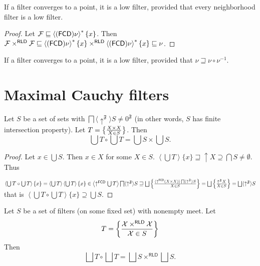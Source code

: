 \begin{prop}
  If a filter converges to a point, it is a low filter, provided that every
  neighborhood filter is a low filter.
\end{prop}

\begin{proof}
  Let $\mathcal{F} \sqsubseteq \left\langle (\mathsf{FCD}) \nu\right\rangle ^{\ast} \{ x \}$. Then $\mathcal{F} \times^{\mathsf{RLD}}
  \mathcal{F} \sqsubseteq \left\langle (\mathsf{FCD}) \nu\right\rangle ^{\ast} \{
  x \} \times^{\mathsf{RLD}} \left\langle (\mathsf{FCD}) \nu\right\rangle ^{\ast} \{ x \} \sqsubseteq \nu$.
\end{proof}

\begin{cor}
  If a filter converges to a point, it is a low filter, provided that $\nu
  \sqsupseteq \nu \circ \nu^{- 1}$.
\end{cor}

\section{Maximal Cauchy filters}

\begin{lem}
  Let $S$ be a set of sets with $\bigsqcap \langle \uparrow^{\mathfrak{F}}
  \rangle S \neq 0^{\mathfrak{F}}$ (in other words, $S$ has finite
  intersection property). Let $T = \left\{ \frac{ X \times X}{X \in S }\right\}$. Then
  \[ \bigcup T \circ \bigcup T = \bigcup S \times \bigcup S. \]
\end{lem}

\begin{proof}
  Let $x \in \bigcup S$. Then $x \in X$ for some $X \in S$. $\left\langle
  \bigcup T \right\rangle \{ x \} \sqsupseteq \uparrow X \supseteq \bigcap S
  \neq \emptyset$. Thus
  
  $\left\langle \bigcup T \circ \bigcup T \right\rangle \{ x \} = \left\langle
  \bigcup T \right\rangle \left\langle \bigcup T \right\rangle \{ x \} \in
  \left\langle \uparrow^{\mathsf{FCD}} \bigcup T \right\rangle
  \bigsqcap \langle \uparrow^{\mathfrak{F}} \rangle S \sqsupseteq \bigsqcup
  \setcond{ \langle \uparrow^{\mathsf{FCD}} (X \times X) \rangle
  \bigsqcap \langle \uparrow^{\mathfrak{F}} \rangle S }{
  X \in S } = \bigsqcup \setcond{ \uparrow^{\mathfrak{F}} X}{X \in S } =
  \bigsqcup \langle
  \uparrow^{\mathfrak{F}} \rangle S$ that is $\left\langle \bigcup T \circ
  \bigcup T \right\rangle \{ x \} \supseteq \bigcup S$.
\end{proof}

\begin{cor}
  Let $S$ be a set of filters (on some fixed set) with nonempty meet. Let
  \[ T = \left\{ \frac{ \mathcal{X} \times^{\mathsf{RLD}} \mathcal{X} }{\mathcal{X} \in S}\right\} \]
  Then
  \[ \bigsqcup T \circ \bigsqcup T = \bigsqcup S \times^{\mathsf{RLD}}
     \bigsqcup S. \]
\end{cor}

